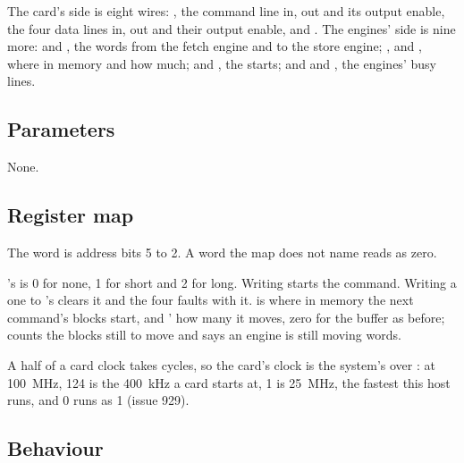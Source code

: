 The card's side is eight wires: , the command line in, out
and its output enable, the four data lines in, out and their output
enable, and . The engines' side is nine more:
 and , the words from the fetch engine
and to the store engine; ,  and
, where in memory and how much; 
and , the starts; and  and
, the engines' busy lines.

\subsection*{Parameters}

None.

\subsection*{Register map}

The word is address bits 5 to 2. A word the map does not name reads as
zero.


's  is 0 for none, 1 for short and 2 for long.
Writing  starts the command. Writing a one to
's  clears it and the four faults with it.
 is where in memory the next command's blocks start, and
'  how many it moves, zero for the buffer as
before;  counts the blocks still to move and 
says an engine is still moving words.

A half of a card clock takes  cycles, so the card's
clock is the system's over : at 100~MHz, 124 is
the 400~kHz a card starts at, 1 is 25~MHz, the fastest this host
runs, and 0 runs as 1 (issue 929).


\subsection*{Behaviour}

